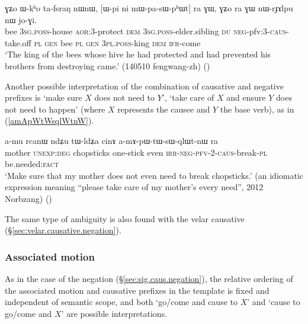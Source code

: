 \begin{exe}
\ex \label{ex:mWpasWphWt}
\gll ɣʑo ɯ-kʰo ta-fsraŋ nɯnɯ, [ɯ-pi ni mɯ-pa-sɯ-pʰɯt] ra ɣɯ, ɣʑo ra ɣɯ nɯ-rɟɤlpu nɯ jo-ɣi. \\
bee \textsc{3sg}.\textsc{poss}-house \textsc{aor}:3\flobv{}-protect \textsc{dem} \textsc{3sg}.\textsc{poss}-elder.sibling \textsc{du} \textsc{neg}-pfv:3\flobv{}-\textsc{caus}-take.off \textsc{pl} \textsc{gen} bee \textsc{pl} \textsc{gen} \textsc{3pl}.\textsc{poss}-king \textsc{dem} \textsc{ifr}-come \\
\glt `The king of the bees whose hive he had protected and had prevented his brothers from destroying came.' (140510 fengwang-zh)
()
\end{exe}


Another possible interpretation of the combination of causative and negative prefixes is `make sure $X$ does not need to $Y$', `take care of $X$ and ensure $Y$ does not need to happen' (where $X$ represents the causee and $Y$ the base verb), as in (\ref{amApWtWsqlWtnW}).

\begin{exe}
\ex \label{amApWtWsqlWtnW}
\gll   a-mu rcanɯ ndʑu tɯ-ldʑa cinɤ  a-mɤ-pɯ-tɯ-sɯ-qlɯt-nɯ ra \\
 mother \textsc{unexp}:\textsc{deg} chopsticks one-stick even  \textsc{irr}-\textsc{neg}-\textsc{pfv}-2-\textsc{caus}-break-\textsc{pl} be.needed:\textsc{fact} \\
 \glt   `Make sure that my mother does not even need to break chopsticks.' (an idiomatic expression meaning ``please take care of my mother's every need'', 2012 Norbzang)
()
\end{exe}

The same type of ambiguity is also found with the velar causative (§\ref{sec:velar.causative.negation}).

\subsubsection{Associated motion} \label{sec:sig.caus.AM} 
As in the case of the negation (§\ref{sec:sig.caus.negation}), the relative ordering of the associated motion and causative prefixes in the template is fixed and independent of semantic scope, and both  `go/come and cause to $X$' and `cause to go/come and $X$' are possible interpretations.

